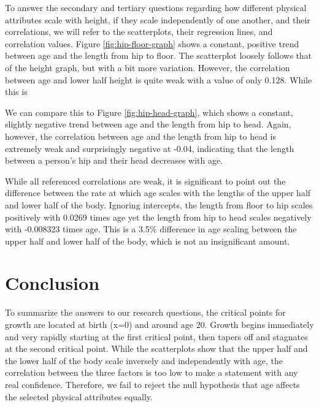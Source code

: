 \documentclass[]{article}
\begin{document}
To answer the secondary and tertiary questions regarding how different
physical attributes scale with height, if they scale independently of
one another, and their correlations, we will refer to the scatterplots,
their regression lines, and correlation values. Figure
\ref{fig:hip-floor-graph} shows a constant, positive trend between age
and the length from hip to floor. The scatterplot loosely follows that
of the height graph, but with a bit more variation. However, the
correlation between age and lower half height is quite weak with a value
of only 0.128. While this is

We can compare this to Figure \ref{fig:hip-head-graph}, which shows a
constant, slightly negative trend between age and the length from hip to
head. Again, however, the correlation between age and the length from
hip to head is extremely weak and surprisingly negative at -0.04,
indicating that the length between a person's hip and their head
decreases with age.

While all referenced correlations are weak, it is significant to point
out the difference between the rate at which age scales with the lengths
of the upper half and lower half of the body. Ignoring intercepts, the
length from floor to hip scales positively with 0.0269 times age yet the
length from hip to head scales negatively with -0.008323 times age. This
is a 3.5\% difference in age scaling between the upper half and lower
half of the body, which is not an insignificant amount.

\section{Conclusion}
\label{sec:conclusion}

To summarize the answers to our research questions, the critical points
for growth are located at birth (x=0) and around age 20. Growth begins
immediately and very rapidly starting at the first critical point, then
tapers off and stagnates at the second critical point. While the
scatterplots show that the upper half and the lower half of the body
scale inversely and independently with age, the correlation between the
three factors is too low to make a statement with any real confidence.
Therefore, we fail to reject the null hypothesis that age affects the
selected physical attributes equally. \newpage

\vspace{0.5in}

\newpage






\newpage
\theendnotes

\newpage
\begin{auxmulticols}{1}
\singlespacing 


\end{auxmulticols}

\newpage
{
\hypersetup{linkcolor=black}
\setcounter{tocdepth}{3}
\tableofcontents
}
\end{document}
